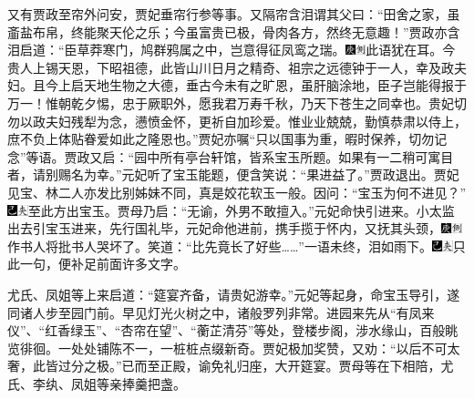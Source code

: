 又有贾政至帘外问安，贾妃垂帘行参等事。又隔帘含泪谓其父曰：“田舍之家，虽齑盐布帛，终能聚天伦之乐；今虽富贵已极，骨肉各方，然终无意趣！”贾政亦含泪启道：“臣草莽寒门，鸠群鸦属之中，岂意得征凤鸾之瑞。{\includegraphics[width=3mm]{../Images/00004}\includegraphics[width=3mm]{../Images/00011}\footnotesize \kaishu 此语犹在耳。}今贵人上锡天恩，下昭祖德，此皆山川日月之精奇、祖宗之远德钟于一人，幸及政夫妇。且今上启天地生物之大德，垂古今未有之旷恩，虽肝脑涂地，臣子岂能得报于万一！惟朝乾夕惕，忠于厥职外，愿我君万寿千秋，乃天下苍生之同幸也。贵妃切勿以政夫妇残犁为念，懑愤金怀，更祈自加珍爱。惟业业兢兢，勤慎恭肃以侍上，庶不负上体贴眷爱如此之隆恩也。”贾妃亦嘱“只以国事为重，暇时保养，切勿记念”等语。贾政又启：“园中所有亭台轩馆，皆系宝玉所题。如果有一二稍可寓目者，请别赐名为幸。”元妃听了宝玉能题，便含笑说：“果进益了。”贾政退出。贾妃见宝、林二人亦发比别姊妹不同，真是姣花软玉一般。因问：“宝玉为何不进见？”{\includegraphics[width=3mm]{../Images/00003}\includegraphics[width=3mm]{../Images/00012}\footnotesize \kaishu 至此方出宝玉。}贾母乃启：“无谕，外男不敢擅入。”元妃命快引进来。小太监出去引宝玉进来，先行国礼毕，元妃命他进前，携手揽于怀内，又抚其头颈，{\includegraphics[width=3mm]{../Images/00004}\includegraphics[width=3mm]{../Images/00011}\footnotesize \kaishu 作书人将批书人哭坏了。}笑道：“比先竟长了好些\ldots{}\ldots{}”一语未终，泪如雨下。{\includegraphics[width=3mm]{../Images/00003}\includegraphics[width=3mm]{../Images/00012}\footnotesize \kaishu 只此一句，便补足前面许多文字。}

尤氏、凤姐等上来启道：“筵宴齐备，请贵妃游幸。”元妃等起身，命宝玉导引，遂同诸人步至园门前。早见灯光火树之中，诸般罗列非常。进园来先从“有凤来仪”、“红香绿玉”、“杏帘在望”、“蘅芷清芬”等处，登楼步阁，涉水缘山，百般眺览徘徊。一处处铺陈不一，一桩桩点缀新奇。贾妃极加奖赞，又劝：“以后不可太奢，此皆过分之极。”已而至正殿，谕免礼归座，大开筵宴。贾母等在下相陪，尤氏、李纨、凤姐等亲捧羹把盏。

